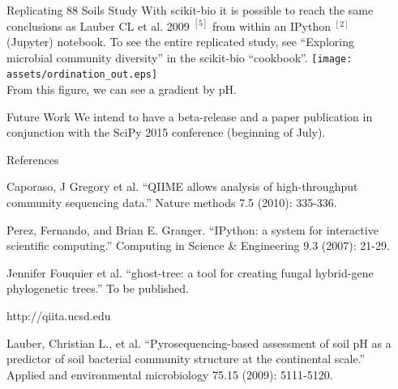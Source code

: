 \documentclass[final,t]{beamer}
\begin{document}
\begin{frame}{}
\begin{columns}[t]
\begin{column}{.3\linewidth}
    \end{column}


    \begin{column}{.3\linewidth}
        \begin{block}{Replicating 88 Soils Study}
            With scikit-bio it is possible to reach the same conclusions as Lauber CL et al. 2009 $^{[5]}$ from within an IPython $^{[2]}$ (Jupyter) notebook. To see the entire replicated study, see ``Exploring microbial community diversity'' in the scikit-bio ``cookbook''.
            \newline\newline
            \texttt{[image: assets/ordination\_out.eps]}\\
            From this figure, we can see a gradient by pH.
        \end{block}

        \begin{block}{Future Work}
            We intend to have a beta-release and a paper publication in conjunction with the SciPy 2015 conference (beginning of July).
            
        \end{block}
        \begin{block}{References}
            \begin{itemize}
              {\footnotesize
              \item[1]Caporaso, J Gregory et al. ``QIIME allows analysis of high-throughput community sequencing data.'' Nature methods 7.5 (2010): 335-336.
              \item[2]Perez, Fernando, and Brian E. Granger. ``IPython: a system for interactive scientific computing.'' Computing in Science \& Engineering 9.3 (2007): 21-29.
              \item[3]Jennifer Fouquier et al. ``ghost-tree: a tool for creating fungal hybrid-gene phylogenetic trees.'' To be published.
              \item[4]http://qiita.ucsd.edu
              \item[5]Lauber, Christian L., et al. ``Pyrosequencing-based assessment of soil pH as a predictor of soil bacterial community structure at the continental scale.'' Applied and environmental microbiology 75.15 (2009): 5111-5120.
              }
          \end{itemize}
        \end{block}





    \end{column}
  \end{columns}

\end{frame}
\end{document}
